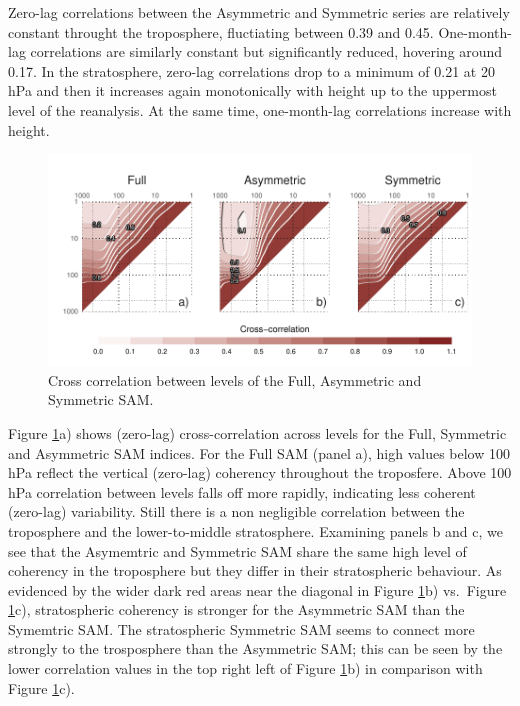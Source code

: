 \documentclass[]{ametsocV5}
\begin{document}
Zero-lag correlations between the Asymmetric and Symmetric series are
relatively constant throught the troposphere, fluctiating between 0.39
and 0.45. One-month-lag correlations are similarly constant but
significantly reduced, hovering around 0.17. In the stratosphere,
zero-lag correlations drop to a minimum of 0.21 at 20 hPa and then it
increases again monotonically with height up to the uppermost level of
the reanalysis. At the same time, one-month-lag correlations increase
with height.

\begin{figure}
\includegraphics{cross-correlation-1} \caption[Cross correlation between levels of the Full, Asymmetric and Symmetric SAM]{Cross correlation between levels of the Full, Asymmetric and Symmetric SAM.}\label{fig:cross-correlation}
\end{figure}

Figure \ref{fig:cross-correlation}a) shows (zero-lag) cross-correlation
across levels for the Full, Symmetric and Asymmetric SAM indices. For
the Full SAM (panel a), high values below 100 hPa reflect the vertical
(zero-lag) coherency throughout the troposfere. Above 100 hPa
correlation between levels falls off more rapidly, indicating less
coherent (zero-lag) variability. Still there is a non negligible
correlation between the troposphere and the lower-to-middle
stratosphere. Examining panels b and c, we see that the Asymemtric and
Symmetric SAM share the same high level of coherency in the troposphere
but they differ in their stratospheric behaviour. As evidenced by the
wider dark red areas near the diagonal in Figure
\ref{fig:cross-correlation}b) vs.~Figure \ref{fig:cross-correlation}c),
stratospheric coherency is stronger for the Asymmetric SAM than the
Symemtric SAM. The stratospheric Symmetric SAM seems to connect more
strongly to the trosposphere than the Asymmetric SAM; this can be seen
by the lower correlation values in the top right left of Figure
\ref{fig:cross-correlation}b) in comparison with Figure
\ref{fig:cross-correlation}c).
\end{document}
